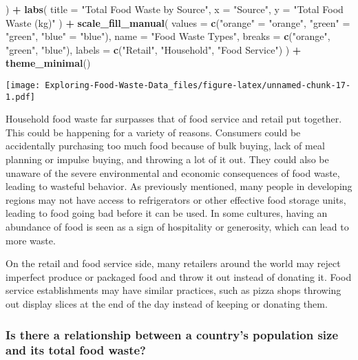 \documentclass[
]{article}
\newenvironment{Shaded}{\begin{snugshade}}{\end{snugshade}}
\newcommand{\AttributeTok}[1]{\textcolor[rgb]{0.13,0.29,0.53}{#1}}
\newcommand{\FunctionTok}[1]{\textcolor[rgb]{0.13,0.29,0.53}{\textbf{#1}}}
\newcommand{\NormalTok}[1]{#1}
\newcommand{\OtherTok}[1]{\textcolor[rgb]{0.56,0.35,0.01}{#1}}
\newcommand{\SpecialCharTok}[1]{\textcolor[rgb]{0.81,0.36,0.00}{\textbf{#1}}}
\newcommand{\StringTok}[1]{\textcolor[rgb]{0.31,0.60,0.02}{#1}}
\begin{document}
\begin{Shaded}
\begin{Highlighting}[]
\NormalTok{  ) }\SpecialCharTok{+}
  \FunctionTok{labs}\NormalTok{(}
    \AttributeTok{title =} \StringTok{"Total Food Waste by Source"}\NormalTok{,}
    \AttributeTok{x =} \StringTok{"Source"}\NormalTok{,}
    \AttributeTok{y =} \StringTok{"Total Food Waste (kg)"}
\NormalTok{  ) }\SpecialCharTok{+}
  \FunctionTok{scale\_fill\_manual}\NormalTok{(}
    \AttributeTok{values =} \FunctionTok{c}\NormalTok{(}\StringTok{"orange"} \OtherTok{=} \StringTok{"orange"}\NormalTok{, }\StringTok{"green"} \OtherTok{=} \StringTok{"green"}\NormalTok{, }\StringTok{"blue"} \OtherTok{=} \StringTok{"blue"}\NormalTok{),}
    \AttributeTok{name =} \StringTok{"Food Waste Types"}\NormalTok{,}
    \AttributeTok{breaks =} \FunctionTok{c}\NormalTok{(}\StringTok{"orange"}\NormalTok{, }\StringTok{"green"}\NormalTok{, }\StringTok{"blue"}\NormalTok{),}
    \AttributeTok{labels =} \FunctionTok{c}\NormalTok{(}\StringTok{"Retail"}\NormalTok{, }\StringTok{"Household"}\NormalTok{, }\StringTok{"Food Service"}\NormalTok{)}
\NormalTok{  ) }\SpecialCharTok{+}
  \FunctionTok{theme\_minimal}\NormalTok{()}
\end{Highlighting}
\end{Shaded}

\texttt{[image: Exploring-Food-Waste-Data\_files/figure-latex/unnamed-chunk-17-1.pdf]}

Household food waste far surpasses that of food service and retail put
together. This could be happening for a variety of reasons. Consumers
could be accidentally purchasing too much food because of bulk buying,
lack of meal planning or impulse buying, and throwing a lot of it out.
They could also be unaware of the severe environmental and economic
consequences of food waste, leading to wasteful behavior. As previously
mentioned, many people in developing regions may not have access to
refrigerators or other effective food storage units, leading to food
going bad before it can be used. In some cultures, having an abundance
of food is seen as a sign of hospitality or generosity, which can lead
to more waste.

On the retail and food service side, many retailers around the world may
reject imperfect produce or packaged food and throw it out instead of
donating it. Food service establishments may have similar practices,
such as pizza shops throwing out display slices at the end of the day
instead of keeping or donating them.

\hypertarget{is-there-a-relationship-between-a-countrys-population-size-and-its-total-food-waste}{%
\subsubsection{Is there a relationship between a country's population
size and its total food
waste?}\label{is-there-a-relationship-between-a-countrys-population-size-and-its-total-food-waste}}
\end{document}
